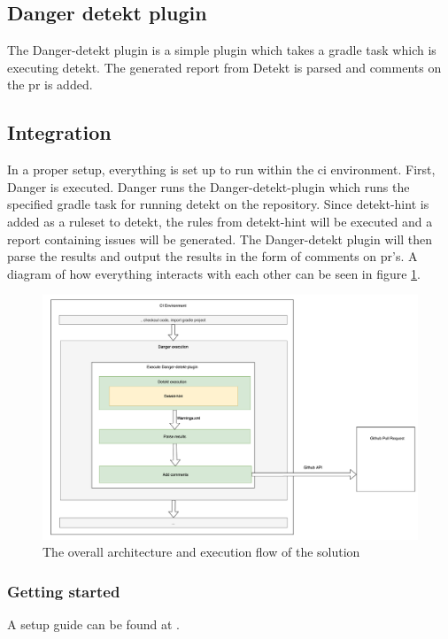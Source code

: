 \documentclass{report}
\begin{document}
\subsection{Danger detekt plugin}
The Danger-detekt plugin is a simple plugin which takes a gradle task which is executing detekt. The generated report from Detekt is parsed and comments on the \gls{pr} is added.

\subsection{Integration}
In a proper setup, everything is set up to run within the \gls{ci} environment. First, Danger is executed. Danger runs the Danger-detekt-plugin which runs the specified gradle task for running detekt on the repository. Since detekt-hint is added as a ruleset to detekt, the rules from detekt-hint will be executed and a report containing issues will be generated. The Danger-detekt plugin will then parse the results and output the results in the form of comments on \gls{pr}'s. A diagram of how everything interacts with each other can be seen in figure \ref{fig:integration}. 


\begin{figure}
    \centering
    \includegraphics[width=\textwidth]{report/images/execution-flow.png}
    \caption{The overall architecture and execution flow of the solution}
    \label{fig:integration}
\end{figure}


\subsubsection{Getting started}
A setup guide can be found at \cite{detekt-hint-repository}.
\end{document}
